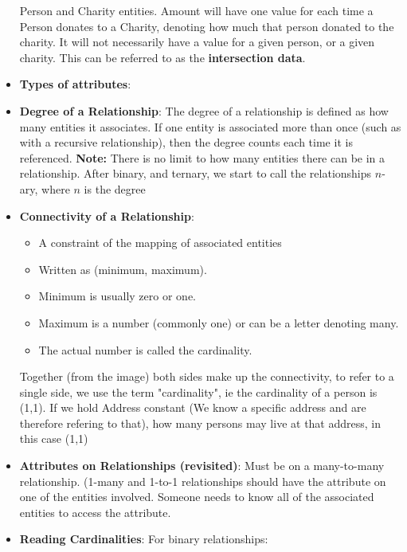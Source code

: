 \documentclass{report}
\begin{document}
\begin{itemize}
            Person and Charity entities. Amount will have one value for each time a Person donates to a Charity, denoting how
            much that person donated to the charity. It will not necessarily have a value for a given person, or a given charity.
            This can be referred to as the \textbf{intersection data}.
        \item \textbf{Types of attributes}:
        \item \textbf{Degree of a Relationship}: The degree of a relationship is defined as how many entities it associates. If one entity is associated more than once
            (such as with a recursive relationship), then the degree counts each time it is referenced.
            \bigbreak \noindent 
            \bigbreak \noindent 
            \textbf{Note:} There is no limit to how many entities there can be in a relationship. After binary, and ternary, we start to call the relationships $n$-ary, where $n$ is the degree
        \item \textbf{Connectivity of a Relationship}:
            \begin{itemize}
                \item A constraint of the mapping of associated entities
                \item Written as (minimum, maximum).
                \item Minimum is usually zero or one.
                \item Maximum is a number (commonly one) or can be a letter denoting many.
                \item The actual number is called the cardinality.
            \end{itemize}
            \bigbreak \noindent 
            \bigbreak \noindent 
            Together (from the image) both sides make up the connectivity, to refer to a single side, we use the term "cardinality", ie the cardinality of a person is (1,1). If we hold Address constant (We know a specific address and are therefore refering to that), how many persons may live at that address, in this case (1,1)
        \item \textbf{Attributes on Relationships (revisited)}: Must be on a many-to-many relationship. (1-many and 1-to-1 relationships should have the attribute on one of
the entities involved.  Someone needs to know all of the associated entities to access the attribute.
        \item \textbf{Reading Cardinalities}: For binary relationships:

\end{itemize}
\end{document}
